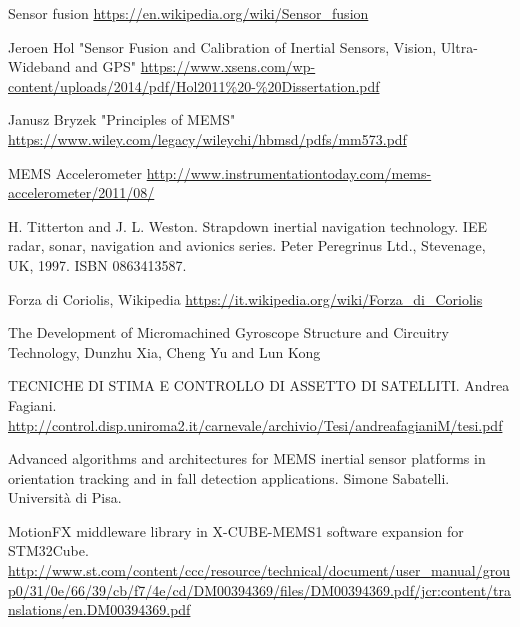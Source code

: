 \begin{thebibliography}{99}
Sensor fusion
\url{https://en.wikipedia.org/wiki/Sensor_fusion}

Jeroen Hol "Sensor Fusion and Calibration of
Inertial Sensors, Vision,
Ultra-Wideband and GPS"
\url{https://www.xsens.com/wp-content/uploads/2014/pdf/Hol2011%20-%20Dissertation.pdf}

Janusz Bryzek "Principles of MEMS"
\url{https://www.wiley.com/legacy/wileychi/hbmsd/pdfs/mm573.pdf}


MEMS Accelerometer
\url{http://www.instrumentationtoday.com/mems-accelerometer/2011/08/}


H. Titterton and J. L. Weston. Strapdown inertial navigation technology. IEE
radar, sonar, navigation and avionics series. Peter Peregrinus Ltd., Stevenage,
UK, 1997. ISBN 0863413587.

Forza di Coriolis, Wikipedia
\url{https://it.wikipedia.org/wiki/Forza_di_Coriolis}

The Development of Micromachined Gyroscope Structure and
Circuitry Technology, Dunzhu Xia, Cheng Yu and Lun Kong

TECNICHE DI STIMA E CONTROLLO DI ASSETTO DI
SATELLITI. Andrea Fagiani. 
\url{http://control.disp.uniroma2.it/carnevale/archivio/Tesi/andreafagianiM/tesi.pdf}




Advanced algorithms and architectures for MEMS inertial sensor platforms 
in orientation tracking and in fall detection applications. Simone Sabatelli.
Università di Pisa.

MotionFX middleware library in X-CUBE-MEMS1 software
expansion for STM32Cube.\\
\url{http://www.st.com/content/ccc/resource/technical/document/user_manual/group0/31/0e/66/39/cb/f7/4e/cd/DM00394369/files/DM00394369.pdf/jcr:content/translations/en.DM00394369.pdf}


\end{thebibliography}



